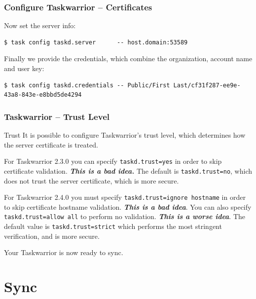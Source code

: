 \documentclass[t,handout]{beamer}
\begin{document}
\begin{frame}[fragile]\frametitle{Configure Taskwarrior -- Certificates}
    \vfill
    Now set the server info:
    \begin{lstlisting}
$ task config taskd.server      -- host.domain:53589\end{lstlisting}

    Finally we provide the credentials, which combine the organization, account name and user key:

    \begin{lstlisting}
$ task config taskd.credentials -- Public/First Last/cf31f287-ee9e-43a8-843e-e8bbd5de4294\end{lstlisting}
\end{frame}

\begin{frame}[fragile]\frametitle{Taskwarrior -- Trust Level}
    \vfill
    \begin{alertblock}{Trust}
        It is possible to configure Taskwarrior's trust level, which determines how the server certificate is treated.

        For Taskwarrior 2.3.0 you can specify \verb+taskd.trust=yes+ in order to skip certificate validation. \textbf{\emph{This is a bad idea.}} The default is \verb+taskd.trust=no+, which does not trust the server certificate, which is more secure.

        For Taskwarrior 2.4.0 you must specify \verb+taskd.trust=ignore hostname+ in order to skip certificate hostname validation. \textbf{\emph{This is a bad idea}}. You can also specify \verb+taskd.trust=allow all+ to perform no validation. \textbf{\emph{This is a worse idea}}. The default value is \verb+taskd.trust=strict+ which performs the most stringent verification, and is more secure.
    \end{alertblock}

    Your Taskwarrior is now ready to sync.
\end{frame}

\section{Sync}
\end{document}
